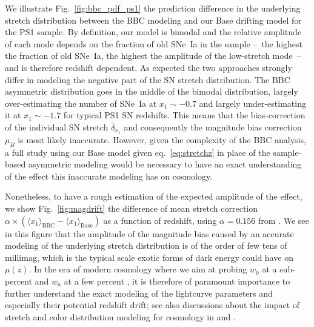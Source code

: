 \documentclass[]{aa} %
\newcommand{\mr}[1]{{\textcolor[rgb]{0.60,0.10,0.6}{#1}}}
\begin{document}
\mr{We illustrate Fig.~\ref{fig:bbc_pdf_ps1} the prediction difference in the
underlying stretch distribution between the BBC modeling and our Base drifting
model for the PS1 sample. By definition, our model is bimodal and the relative
amplitude of each mode depends on the fraction of old SNe~Ia in the sample
--~the highest the fraction of old SNe~Ia, the highest the amplitude of the
low-stretch mode~-- and is therefore redshift dependent. As expected the two
approaches strongly differ in modeling the negative part of the SN stretch
distribution. The BBC asymmetric distribution goes in the middle of the bimodal
distribution, largely over-estimating the number of SNe~Ia at $x_1\sim-0.7$ and
largely under-estimating it at $x_1\sim-1.7$ for typical PS1 SN redshifts. This
means that the bias-correction of the individual SN stretch
$\overline{\delta}_{x_1}$ \citep{kessler2017} and consequently the magnitude
bias correction $\mu_B$ is most likely inaccurate. However, given the complexity
of the BBC analysis, a full study using our Base model given
eq.~\ref{eq:stretchz} in place of the sample-based asymmetric modeling would be
necessary to have an exact understanding of the effect this inaccurate modeling
has on cosmology.}

\mr{Nonetheless, to have a rough estimation of the expected amplitude of the
effect, we show Fig.~\ref{fig:magdrift} the difference of mean stretch
correction $\alpha\times\left(\langle x_1 \rangle_{\mathrm{BBC}} - \langle x_1
\rangle_{\mathrm{Base}}\right)$ as a function of redshift, using $\alpha=0.156$
from \cite{scolnic2018a}. We see in this figure that the amplitude of the
magnitude bias caused by an accurate modeling of the underlying stretch
distribution is of the order of few tens of millimag, which is the typical scale
exotic forms of dark energy could have on $\mu(z)$. In the era of modern
cosmology where we aim at probing $w_0$ at a sub-percent and $w_a$ at a few
percent \citep[e.g.,][]{lsstpaper}, it is therefore of paramount importance to
further understand the exact modeling of the lightcurve parameters and
especially their potential redshift drift; see also discussions about the impact
of stretch and color distribution modeling for cosmology in \citealt{rubin2015}
and \citealt{rubin2016}.}
\end{document}
